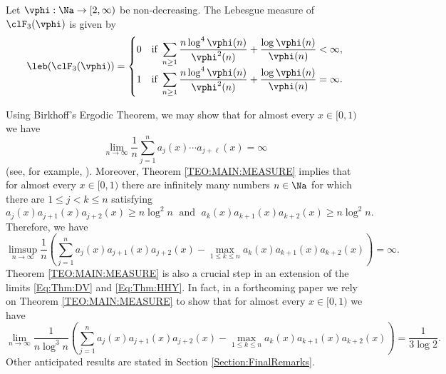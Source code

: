 \documentclass[12pt,a4paper]{amsart}
\begin{document}
\begin{teo01}\label{TEO:MAIN:MEASURE}
 Let  $\vphi:\Na\to[2,\infty)$ be non-decreasing. 
 The Lebesgue measure of $ \clF_{3}(\vphi)$ is given by
\[
\leb(\clF_{3}(\vphi))
=
\begin{cases}
0 &\text{\rm if } \displaystyle\sum_{n\geq 1} 
\frac{n\log^{4}\vphi(n)}{\vphi^2(n)} + \frac{\log \vphi(n)}{\vphi(n)}<\infty, \\
1 &\text{\rm if } \displaystyle\sum_{n\geq 1} 
\frac{n\log^{4}\vphi(n)}{\vphi^2(n)} + \frac{\log \vphi(n)}{\vphi(n)}=\infty.
\end{cases}
\]
\end{teo01}
\begin{rema01}
Using Birkhoff's Ergodic Theorem, we may show that for almost every $x\in [0,1)$ we have
\[
\lim_{n\to\infty}
\frac{1}{n}
\sum_{j=1}^n a_j(x)\cdots a_{j+\ell}(x)
=
\infty
\]
(see, for example, \cite[Corollary 3.8]{EinsiedlerWardET}).
Moreover, Theorem \ref{TEO:MAIN:MEASURE} implies that for almost every $x\in [0,1)$ there are infinitely many numbers $n\in\Na$ for which there are $1\leq j<k\leq n$ satisfying 
\[
a_{j}(x)a_{j+1}(x)a_{j+2}(x)  \geq n\log^{2}n
\;\text{ and }\;
a_{k}(x)a_{k+1}(x)a_{k+2}(x)  \geq n\log^{2}n.
\]
Therefore, we have 
\[
\limsup_{n\to\infty}  
\frac{1}{n} \left(\sum_{j=1}^n a_{j}(x)a_{j+1}(x)a_{j+2}(x)  
- 
\max_{1\leq k\leq n} a_{k}(x)a_{k+1}(x)a_{k+2}(x) \right)
=
\infty.
\]
Theorem \ref{TEO:MAIN:MEASURE} is also a crucial step in an extension of the limits \eqref{Eq:Thm:DV} and \eqref{Eq:Thm:HHY}. In fact, in a forthcoming paper we rely on Theorem \ref{TEO:MAIN:MEASURE} to show that for almost every $x\in [0,1)$ we have 
\[
\lim_{n\to\infty} 
\frac{1}{n\log^{3} n} 
\left( \sum_{j=1}^na_{j}(x) a_{j+1}(x)a_{j+2}(x) 
- 
\max_{1\leq k\leq n} a_{k}(x)a_{k+1}(x)a_{k+2}(x)\right)
=
\frac{1}{3 \log 2}.
\]
Other anticipated results are stated in Section \ref{Section:FinalRemarks}. 

\end{rema01}
\end{document}
